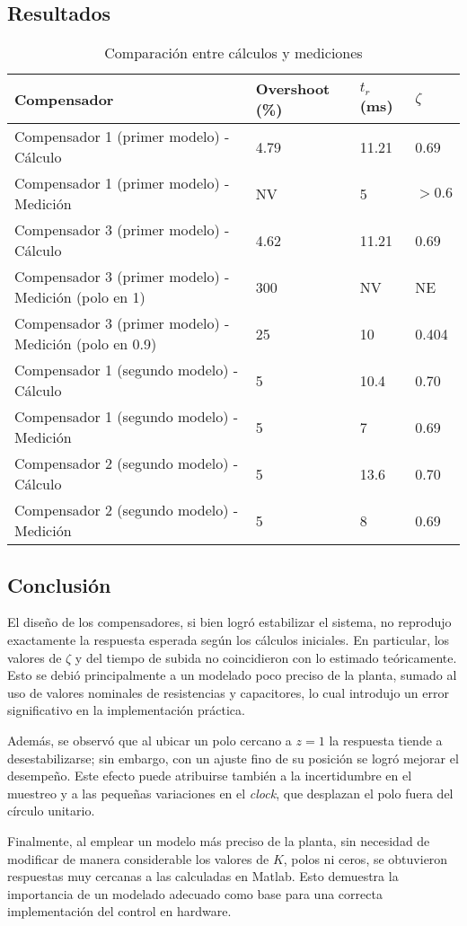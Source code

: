 \onecolumn
\subsection{Resultados}
\begin{table}[H]
\centering
\caption{Comparación entre cálculos y mediciones}
\begin{tabular}{|l|l|l|l|}
	\hline
	\textbf{Compensador} & \textbf{Overshoot (\%)} & \textbf{$t_r$ (ms)} & \textbf{$\zeta$} \\ \hline
	Compensador 1 (primer modelo) - Cálculo  & 4.79 & 11.21 & 0.69 \\ \hline
	Compensador 1 (primer modelo) - Medición & NV   & 5     & $>0.6$ \\ \hline
	Compensador 3 (primer modelo) - Cálculo  & 4.62 & 11.21 & 0.69 \\ \hline
	Compensador 3 (primer modelo) - Medición (polo en 1)   & 300  & NV    & NE \\ \hline
	Compensador 3 (primer modelo) - Medición (polo en 0.9) & 25   & 10    & 0.404 \\ \hline
	Compensador 1 (segundo modelo) - Cálculo & 5    & 10.4  & 0.70 \\ \hline
	Compensador 1 (segundo modelo) - Medición& 5    & 7     & 0.69 \\ \hline
	Compensador 2 (segundo modelo) - Cálculo & 5    & 13.6  & 0.70 \\ \hline
	Compensador 2 (segundo modelo) - Medición& 5    & 8     & 0.69 \\ \hline
\end{tabular}
\end{table}

\subsection{Conclusión}

El diseño de los compensadores, si bien logró estabilizar el sistema, no reprodujo exactamente la respuesta esperada según los cálculos iniciales. En particular, los valores de $\zeta$ y del tiempo de subida no coincidieron con lo estimado teóricamente. Esto se debió principalmente a un modelado poco preciso de la planta, sumado al uso de valores nominales de resistencias y capacitores, lo cual introdujo un error significativo en la implementación práctica.  

Además, se observó que al ubicar un polo cercano a $z=1$ la respuesta tiende a desestabilizarse; sin embargo, con un ajuste fino de su posición se logró mejorar el desempeño. Este efecto puede atribuirse también a la incertidumbre en el muestreo y a las pequeñas variaciones en el \textit{clock}, que desplazan el polo fuera del círculo unitario.  

Finalmente, al emplear un modelo más preciso de la planta, sin necesidad de modificar de manera considerable los valores de $K$, polos ni ceros, se obtuvieron respuestas muy cercanas a las calculadas en Matlab. Esto demuestra la importancia de un modelado adecuado como base para una correcta implementación del control en hardware.





\balance